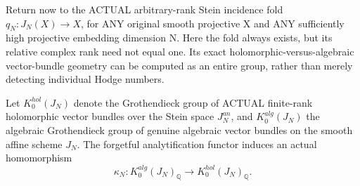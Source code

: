 \documentclass[11pt]{article}
\begin{document}
Return now to the ACTUAL arbitrary-rank Stein incidence fold
$q_N:J_N(X)\to X$, for ANY original smooth projective X
and ANY sufficiently high projective embedding dimension N.
Here the fold always exists, but its relative complex rank
need not equal one. Its exact holomorphic-versus-algebraic
vector-bundle geometry can be computed as an entire
group, rather than merely detecting individual
Hodge numbers.

Let $K_0^{hol}(J_N)$ denote the Grothendieck
group of ACTUAL finite-rank holomorphic vector bundles
over the Stein space $J_N^{an}$, and
$K_0^{alg}(J_N)$ the algebraic Grothendieck group
of genuine algebraic vector bundles on the smooth affine
scheme $J_N$. The forgetful analytification functor
induces an actual homomorphism
\[
 \kappa_N:K_0^{alg}(J_N)_{\mathbb Q}
                  \longrightarrow
           K_0^{hol}(J_N)_{\mathbb Q}.
 \tag{8}
\]
\end{document}
